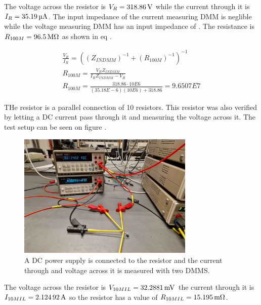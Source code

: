The voltage across the resistor is $V_R = \SI{318.86}{\volt}$ while the current through it is $I_R = \SI{35.19}{\micro\ampere}$. The input impedance of the current measuring DMM is neglible while the voltage measuring DMM has an input impedance of . The resistance is $R_{100M} = \SI{96.5}{\mega\ohm}$ as shown in eq .

\begin{equation}\label{eq:A_Z_100MegTest}
    \begin{split}
        \frac{V_R}{I_R} = ((Z_{INDMM})^{-1} + (R_{100M})^{-1})^{-1}\\
        R_{100M} = \frac{V_R Z_{INDMM}}{I_R Z_{INDMM}-V_R}\\
        R_{100M} = \frac{318.86 \cdot 10E6}{(35.18E-6)(10E6) + 318.86} = 9.6507E7
    \end{split}
\end{equation}

THe  resistor is a parallel connection of 10  resistors. This resistor was also verified by letting a DC current pass through it and measuring the voltage across it. The test setup can be seen on figure .

\begin{figure}[H]
    \centering
    \includegraphics[clip, trim=0 0 0 0, width=0.75\textwidth]{Appendix/Figures/A_Z_10MilliSetup.pdf}
    \caption{A DC power supply is connected to the  resistor and the current through and voltage across it is measured with two DMMS.}
    \label{fig:App_A_Z_100MilliSetup}
\end{figure}

The voltage across the resistor is $V_{10MIL} = \SI{32.2881}{\milli\volt}$ the current through it is $I_{10MIL} = \SI{2.12492}{\ampere}$ so the resistor has a value of $R_{10MIL} =\SI{15.195}{\milli\ohm}$.

